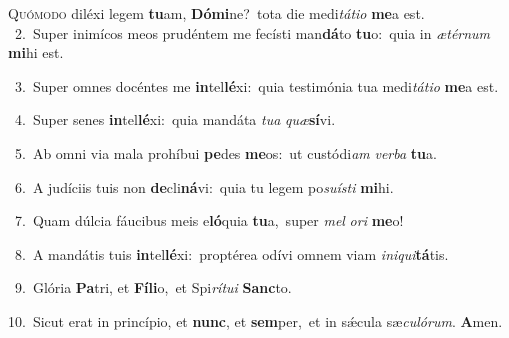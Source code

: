 \lettrine{\initial\textcolor{\initialcolor}{Q}}{uómodo} diléxi legem \textbf{tu}\-am, \textbf{Dó}\-\textbf{mi}ne?~\star tota die medi\-\textit{tá}\-\textit{ti}\textit{o} \textbf{me}\-a est.\\
{\numbfont\textcolor{\numbcolor}{~2.}}~Super inimícos meos prudéntem me fecísti man\-\textbf{dá}\-to \textbf{tu}\-o:~\star quia in \textit{æ}\-\textit{tér}\textit{num} \textbf{mi}\-hi est.\par
{\numbfont\textcolor{\numbcolor}{~3.}}~Super omnes docéntes me \textbf{in}\-tel\-\textbf{lé}\-xi:~\star quia testimónia tua medi\-\textit{tá}\-\textit{ti}\textit{o} \textbf{me}\-a est.\par
{\numbfont\textcolor{\numbcolor}{~4.}}~Super senes \textbf{in}\-tel\-\textbf{lé}\-xi:~\star quia mandáta \textit{tu}\-\textit{a} \textit{quæ}\-\textbf{sí}vi.\par
{\numbfont\textcolor{\numbcolor}{~5.}}~Ab omni via mala prohíbui \textbf{pe}\-des \textbf{me}\-os:~\star ut custódi\textit{am} \textit{ver}\-\textit{ba} \textbf{tu}\-a.\par
{\numbfont\textcolor{\numbcolor}{~6.}}~A judíciis tuis non \textbf{de}\-cli\-\textbf{ná}\-vi:~\star quia tu legem po\-\textit{su}\-\textit{ís}\textit{ti} \textbf{mi}\-hi.\par
{\numbfont\textcolor{\numbcolor}{~7.}}~Quam dúlcia fáucibus meis e\-\textbf{ló}\-quia \textbf{tu}\-a,~\star super \textit{mel} \textit{o}\-\textit{ri} \textbf{me}\-o!\par
{\numbfont\textcolor{\numbcolor}{~8.}}~A mandátis tuis \textbf{in}\-tel\-\textbf{lé}\-xi:~\star proptérea odívi omnem viam \textit{in}\-\textit{i}\textit{qui}\textbf{tá}tis.\par
{\numbfont\textcolor{\numbcolor}{~9.}}~Glória \textbf{Pa}\-tri, et \textbf{Fí}\-\textbf{li}o,~\star et Spi\-\textit{rí}\-\textit{tu}\textit{i} \textbf{Sanc}\-to.\par
{\numbfont\textcolor{\numbcolor}{10.}}~Sicut erat in princípio, et \textbf{nunc}\-, et \textbf{sem}\-per,~\star et in sǽcula sæ\-\textit{cu}\-\textit{ló}\textit{rum}. \textbf{A}\-men.\par
